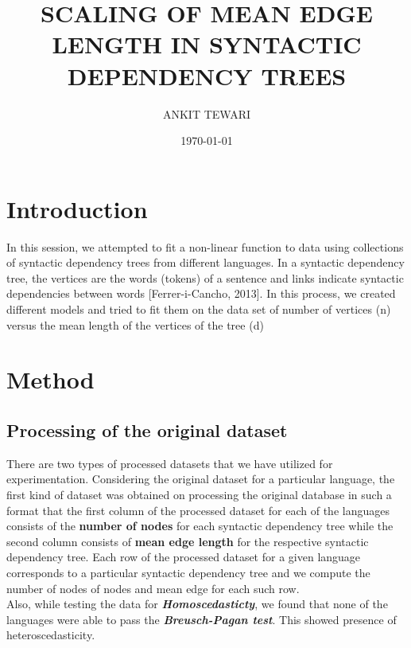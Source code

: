 \documentclass[a4paper]{article}
\title{\textbf{SCALING OF MEAN EDGE LENGTH IN SYNTACTIC DEPENDENCY TREES}}
\author{ANKIT TEWARI }
\date{\today}
\begin{document}
\maketitle

\section{Introduction}
In this session, we attempted to fit a non-linear function to data using collections of syntactic dependency trees from different languages. In a syntactic dependency tree, the vertices are the words (tokens) of a sentence and links indicate syntactic dependencies between words [Ferrer-i-Cancho, 2013].
In this process, we created different models and tried to fit them on the data set of number of vertices (n) versus the mean length of the vertices of the tree (d)
	
\section[Data Pre-Processing]{Method}
\subsection{Processing of the original dataset}
There are two types of processed datasets that we have utilized for experimentation. Considering the original dataset for a particular language, the first kind of dataset was obtained on processing the original database in such a format that the first column of the processed dataset for each of the languages consists of the \textbf{number of nodes} for each syntactic dependency tree while the second column consists of \textbf{mean edge length} for the respective syntactic dependency tree. Each row of the processed dataset for a given language corresponds to a particular syntactic dependency tree and we compute the number of nodes of nodes and mean edge for each such row.\\
Also, while testing the data for \textit{\textbf{Homoscedasticty}}, we found that none of the languages were able to pass the \textit{\textbf{Breusch-Pagan test}}. This showed presence of heteroscedasticity.   

\end{document}
